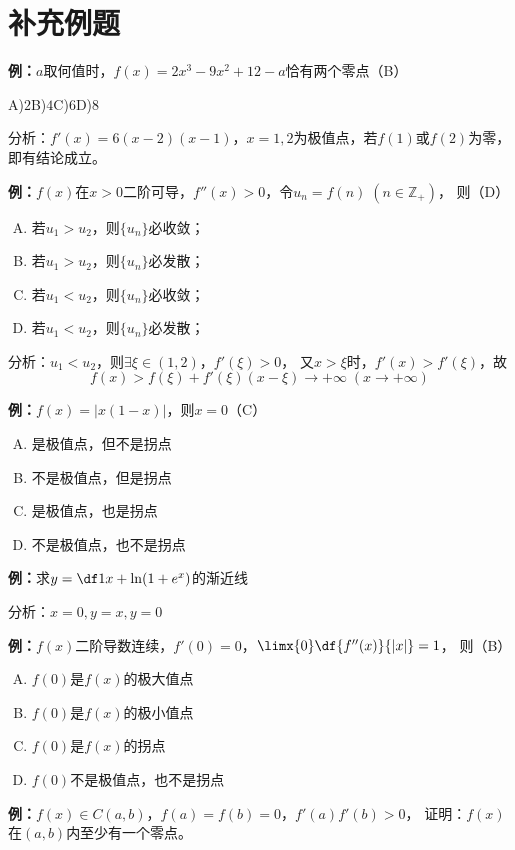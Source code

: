 \section*{补充例题}

{\bf 例：}$a$取何值时，$f(x)=2x^3-9x^2+12-a$恰有两个零点（B）

A)$2$\quad B)$4$\quad C)$6$\quad D)$8$

分析：$f'(x)=6(x-2)(x-1)$，$x=1,2$为极值点，若$f(1)$或$f(2)$为零，即有结论成立。

{\bf 例：}$f(x)$在$x>0$二阶可导，$f''(x)>0$，令$u_n=f(n)\;(n\in\mathbb{Z}_+)$，
则（D）
\begin{enumerate}[A)]
  \setlength{\itemindent}{1cm}
  \item 若$u_1>u_2$，则$\{u_n\}$必收敛；
  \item 若$u_1>u_2$，则$\{u_n\}$必发散；
  \item 若$u_1<u_2$，则$\{u_n\}$必收敛；
  \item 若$u_1<u_2$，则$\{u_n\}$必发散；
\end{enumerate}

分析：$u_1<u_2$，则$\exists\xi\in(1,2)$，$f'(\xi)>0$，
又$x>\xi$时，$f'(x)>f'(\xi)$，故
$$f(x)>f(\xi)+f'(\xi)(x-\xi)\to+\infty\;(x\to+\infty)$$

{\bf 例：}$f(x)=|x(1-x)|$，则$x=0$（C）
\begin{enumerate}[A)]
  \setlength{\itemindent}{1cm}
  \item 是极值点，但不是拐点
  \item 不是极值点，但是拐点
  \item 是极值点，也是拐点
  \item 不是极值点，也不是拐点
\end{enumerate}

{\bf 例：}求$y=\df1x+\ln(1+e^x)$的渐近线

分析：$x=0,y=x,y=0$

{\bf 例：}$f(x)$二阶导数连续，$f'(0)=0$，$\limx{0}\df{f''(x)}{|x|}=1$，
则（B）
\begin{enumerate}[A)]
  \setlength{\itemindent}{1cm}
  \item $f(0)$是$f(x)$的极大值点
  \item $f(0)$是$f(x)$的极小值点
  \item $f(0)$是$f(x)$的拐点
  \item $f(0)$不是极值点，也不是拐点
\end{enumerate}

{\bf 例：}$f(x)\in C(a,b)$，$f(a)=f(b)=0$，$f'(a)f'(b)>0$，
证明：$f(x)$在$(a,b)$内至少有一个零点。

